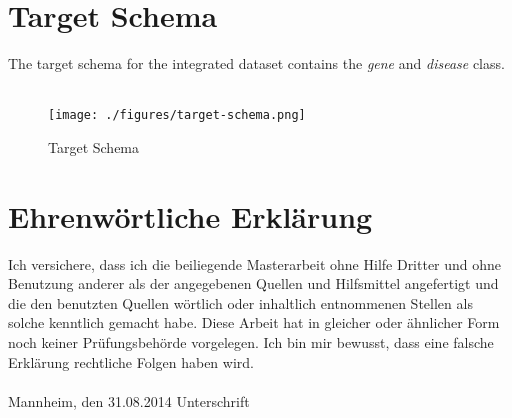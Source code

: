 \documentclass[11pt,titlepage,oneside,openany]{book}
\begin{document}
\section{Target Schema}
\label{target-schema}
The target schema for the integrated dataset contains the \textit{gene} and \textit{disease} class.
\\
\\
\begin{figure}
	\begin{center}
	\texttt{[image: ./figures/target-schema.png]}
	\caption[Target Schema]{Target Schema}
	\label{fig:target-schema}
	\end{center}
\end{figure}	

\newpage


\pagestyle{empty}


\section*{Ehrenw\"ortliche Erkl\"arung}
Ich versichere, dass ich die beiliegende Masterarbeit ohne Hilfe Dritter und ohne Benutzung anderer als der angegebenen Quellen und Hilfsmittel angefertigt und die den benutzten Quellen w\"ortlich oder inhaltlich entnommenen Stellen als solche kenntlich gemacht habe. Diese Arbeit
hat in gleicher oder \"ahnlicher Form noch keiner Pr\"ufungsbeh\"orde vorgelegen. Ich bin mir bewusst, dass eine falsche Erkl\"arung rechtliche Folgen haben wird.
\\
\\

\noindent
Mannheim, den 31.08.2014 \hspace{4cm} Unterschrift
\end{document}

